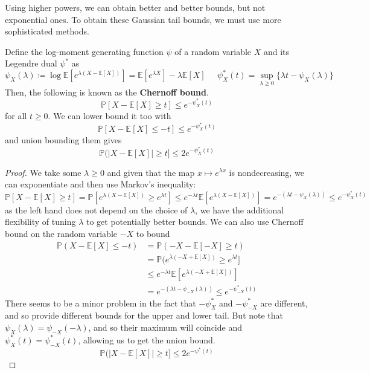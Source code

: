\documentclass{article}
\begin{document}
Using higher powers, we can obtain better and better bounds, but not exponential ones. To obtain these Gaussian tail bounds, we must use more sophisticated methods. 

\begin{lemma}
Define the log-moment generating function $\psi$ of a random variable $X$ and its Legendre dual $\psi^*$ as 
\[\psi_X (\lambda) \coloneqq \log \mathbb{E}[ e^{\lambda (X - \mathbb{E}[X])} ] = \mathbb{E}[ e^{\lambda X} ] - \lambda \mathbb{E}[X] \;\;\;\;\; \psi_X^* (t) = \sup_{\lambda \geq 0} \{ \lambda t - \psi_X(\lambda)\}\]
Then, the following is known as the \textbf{Chernoff bound}. 
\[\mathbb{P}[X - \mathbb{E}[X] \geq t] \leq e^{-\psi_X^* (t)}\]
for all $t \geq 0$. We can lower bound it too with 
\[\mathbb{P}[X - \mathbb{E}[X] \leq -t] \leq e^{-\psi_X^* (t)}\]
and union bounding them gives 
\[\mathbb{P}(|X - \mathbb{E}[X] | \geq t ] \leq 2e^{- \psi_X^* (t)}\]
\end{lemma}
\begin{proof}
We take some $\lambda \geq 0$ and given that the map $x \mapsto e^{\lambda x}$ is nondecreasing, we can exponentiate and then use Markov's inequality: 
\[\mathbb{P}[X - \mathbb{E}[X] \geq t ] = \mathbb{P}[ e^{\lambda(X - \mathbb{E}[X])} \geq e^{\lambda t}] \leq e^{-\lambda t} \mathbb{E}[e^{\lambda (X - \mathbb{E}[X])}] = e^{- (\lambda t - \psi_X (\lambda))} \leq e^{-\psi_X^* (t)}\]
as the left hand does not depend on the choice of $\lambda$, we have the additional flexibility of tuning $\lambda$ to get potentially better bounds. We can also use Chernoff bound on the random variable $-X$ to bound \begin{align*}
    \mathbb{P}(X - \mathbb{E}[X] \leq -t) & = \mathbb{P}(-X - \mathbb{E}[-X] \geq t) \\
    & = \mathbb{P}(e^{\lambda(-X + \mathbb{E}[X])} \geq e^{\lambda t} ] \\
    & \leq e^{-\lambda t} \mathbb{E}[ e^{\lambda (-X + \mathbb{E}[X])}] \\
    & = e^{-(\lambda t - \psi_{-X}(\lambda))} \leq e^{-\psi_{-X}^* (t)} 
\end{align*}
There seems to be a minor problem in the fact that $-\psi^*_X$ and $-\psi^*_{-X}$ are different, and so provide different bounds for the upper and lower tail. But note that $\psi_X (\lambda) = \psi_{-X}(-\lambda)$, and so their maximum will coincide and $\psi_X^* (t) = \psi_{-X}^* (t)$, allowing us to get the union bound. 
\[\mathbb{P}(|X - \mathbb{E}[X] | \geq t ] \leq 2e^{- \psi^* (t)}\]
\end{proof}
\end{document}
